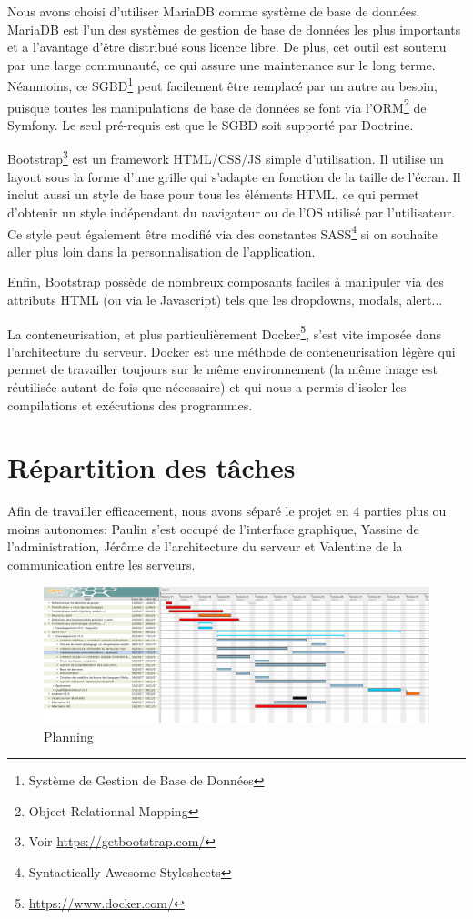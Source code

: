 \par Nous avons choisi d'utiliser MariaDB comme système de base de données. MariaDB est l'un des systèmes de gestion de base de données les plus importants et a l'avantage d'être distribué sous licence libre. De plus, cet outil est soutenu par une large communauté, ce qui assure une maintenance sur le long terme. Néanmoins, ce SGBD\footnote{Système de Gestion de Base de Données} peut facilement être remplacé par un autre au besoin, puisque toutes les manipulations de base de données se font via l'ORM\footnote{Object-Relationnal Mapping} de Symfony. Le seul pré-requis est que le SGBD soit supporté par Doctrine. \\

\par Bootstrap\footnote{Voir \url{https://getbootstrap.com/}} est un framework HTML/CSS/JS simple d'utilisation. Il utilise un layout sous la forme d'une grille qui s'adapte en fonction de la taille de l'écran. Il inclut aussi un style de base pour tous les éléments HTML, ce qui permet d'obtenir un style indépendant du navigateur ou de l'OS utilisé par l'utilisateur. Ce style peut également être modifié via des constantes SASS\footnote{Syntactically Awesome Stylesheets} si on souhaite aller plus loin dans la personnalisation de l'application.
\par Enfin, Bootstrap possède de nombreux composants faciles à manipuler via des attributs HTML (ou via le Javascript) tels que les dropdowns, modals, alert... \\

\par La conteneurisation, et plus particulièrement Docker\footnote{\url{https://www.docker.com/}}, s'est vite imposée dans l'architecture du serveur. Docker est une méthode de conteneurisation légère qui permet de travailler toujours sur le même environnement (la même image est réutilisée autant de fois que nécessaire) et qui nous a permis d'isoler les compilations et exécutions des programmes.

\section{Répartition des tâches}

\par Afin de travailler efficacement, nous avons séparé le projet en 4 parties plus ou moins autonomes: Paulin s'est occupé de l'interface graphique, Yassine de l'administration, Jérôme de l'architecture du serveur et Valentine de la communication entre les serveurs.

\begin{figure}[H]
\centering
\includegraphics[width=1\textwidth]{./img/gantt_LIDE.png}
\caption{Planning}
\end{figure}
